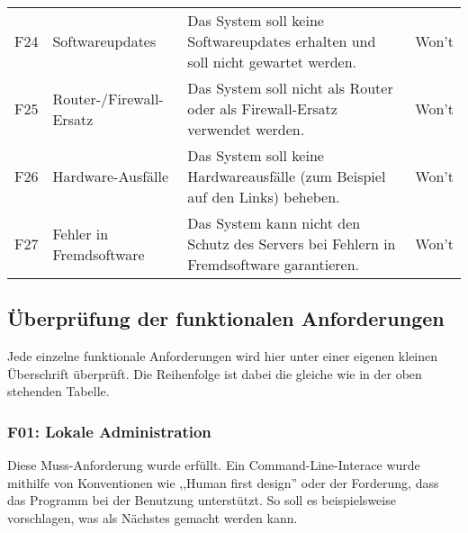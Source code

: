 \documentclass[../review_3.tex]{subfiles}
\begin{document}
\begin{longtable} [h] {p{1cm} p{4cm} p{7cm} l}
    F24                                                                                                                                                                                                              & Softwareupdates                                & Das System soll keine Softwareupdates erhalten und soll nicht gewartet werden.                                                                                                                                                                                      & Won't           \\
    F25                                                                                                                                                                                                              & Router-/Firewall-Ersatz                                & Das System soll  nicht als Router oder als Firewall-Ersatz verwendet werden.                                                                                                   & Won't           \\
    F26                                                                                                                                                                                                              & Hardware-Ausfälle                              & Das System soll keine Hardwareausfälle (zum Beispiel auf den Links) beheben.                                             & Won't           \\
    F27                                                                                                                                                                                                              & Fehler in Fremdsoftware                              & Das System kann nicht den Schutz des Servers bei Fehlern in Fremdsoftware garantieren.    & Won't        \\ \bottomrule
\end{longtable} %

\subsection{Überprüfung der funktionalen Anforderungen}
Jede einzelne funktionale Anforderungen wird hier unter einer eigenen kleinen Überschrift überprüft. Die Reihenfolge ist dabei die gleiche wie in der oben stehenden Tabelle.

\subsubsection{F01: Lokale Administration}
Diese Muss-Anforderung wurde erfüllt. Ein Command-Line-Interace wurde mithilfe von Konventionen wie ,,Human first design'' oder der Forderung, dass das Programm bei der Benutzung unterstützt. So soll es beispielsweise vorschlagen, was als Nächstes gemacht werden kann.
\end{document}
